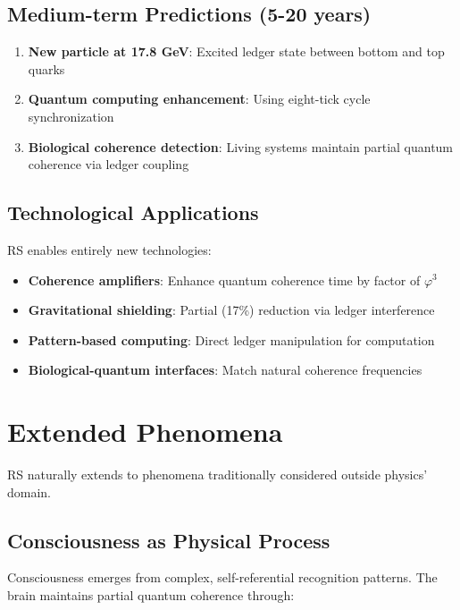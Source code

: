 \documentclass[12pt,a4paper]{article}
\newcommand{\golden}{\varphi}
\theoremstyle{definition}
\begin{document}
\subsection{Medium-term Predictions (5-20 years)}

\begin{enumerate}
    \item \textbf{New particle at 17.8 GeV}: Excited ledger state between bottom and top quarks
    \item \textbf{Quantum computing enhancement}: Using eight-tick cycle synchronization
    \item \textbf{Biological coherence detection}: Living systems maintain partial quantum coherence via ledger coupling
\end{enumerate}

\subsection{Technological Applications}

RS enables entirely new technologies:

\begin{itemize}
    \item \textbf{Coherence amplifiers}: Enhance quantum coherence time by factor of $\golden^3$
    \item \textbf{Gravitational shielding}: Partial (17\%) reduction via ledger interference
    \item \textbf{Pattern-based computing}: Direct ledger manipulation for computation
    \item \textbf{Biological-quantum interfaces}: Match natural coherence frequencies
\end{itemize}

\section{Extended Phenomena}

RS naturally extends to phenomena traditionally considered outside physics' domain.

\subsection{Consciousness as Physical Process}

Consciousness emerges from complex, self-referential recognition patterns. The brain maintains partial quantum coherence through:
\end{document}
